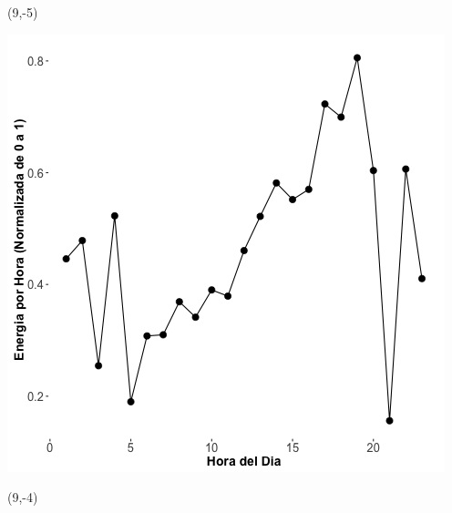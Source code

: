 \documentclass{article}\usepackage[]{graphicx}\usepackage[]{color}
\newenvironment{knitrout}{}{} %
\begin{document}
 \begin{textblock}{1}(9,-5)
\begin{minipage}{20em}
\begingroup

\endgroup
\end{minipage}
\end{textblock}

\begin{knitrout}
\color{fgcolor}
\includegraphics[scale=0.65]{figure/A9_plot_norm_median} 
\end{knitrout}


 \begin{textblock}{1}(9,-4)
\begin{minipage}{20em}
\begingroup

\endgroup
\end{minipage}
\end{textblock}
\end{document}
